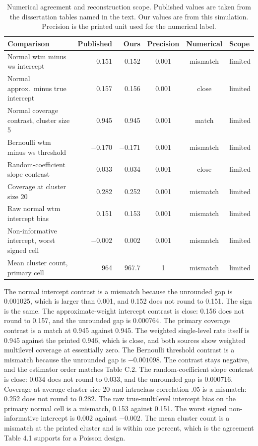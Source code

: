 \begin{table}[H]
\centering
\footnotesize
\setlength{\tabcolsep}{4pt}
\renewcommand{\arraystretch}{1.3}
\caption{Numerical agreement and reconstruction scope.
Published values are taken from the dissertation tables named in the text.
Our values are from this simulation.
Precision is the printed unit used for the numerical label.}
\label{tab:compare}
\begin{tabular}{@{}p{2.15in}rrccp{0.72in}@{}}
\toprule
Comparison & Published & Ours & Precision & Numerical & Scope \\
\midrule
Normal wtm minus ws intercept & 0.151 & 0.152 & 0.001 & mismatch & limited \\
Normal approx.\ minus true intercept & 0.157 & 0.156 & 0.001 & close & limited \\
Normal coverage contrast, cluster size 5 & 0.945 & 0.945 & 0.001 & match & limited \\
Bernoulli wtm minus ws threshold & $-0.170$ & $-0.171$ & 0.001 & mismatch & limited \\
Random-coefficient slope contrast & 0.033 & 0.034 & 0.001 & close & limited \\
Coverage at cluster size 20 & 0.282 & 0.252 & 0.001 & mismatch & limited \\
Raw normal wtm intercept bias & 0.151 & 0.153 & 0.001 & mismatch & limited \\
Non-informative intercept, worst signed cell & $-0.002$ & 0.002 & 0.001 & mismatch & limited \\
Mean cluster count, primary cell & 964 & 967.7 & 1 & mismatch & limited \\
\bottomrule
\end{tabular}
\end{table}

The normal intercept contrast is a mismatch because the unrounded gap is
0.001025, which is larger than 0.001, and 0.152 does not round to 0.151.
The sign is the same.
The approximate-weight intercept contrast is close: 0.156 does not round to
0.157, and the unrounded gap is 0.000764.
The primary coverage contrast is a match at 0.945 against 0.945.
The weighted single-level rate itself is 0.945 against the printed 0.946,
which is close, and both sources show weighted multilevel coverage at
essentially zero.
The Bernoulli threshold contrast is a mismatch because the unrounded gap is
$-0.001098$.
The contrast stays negative, and the estimator order matches Table C.2.
The random-coefficient slope contrast is close: 0.034 does not round to
0.033, and the unrounded gap is 0.000716.
Coverage at average cluster size 20 and intraclass correlation .05 is a
mismatch: 0.252 does not round to 0.282.
The raw true-multilevel intercept bias on the primary normal cell is a
mismatch, 0.153 against 0.151.
The worst signed non-informative intercept is 0.002 against $-0.002$.
The mean cluster count is a mismatch at the printed cluster and is within one
percent, which is the agreement Table 4.1 supports for a Poisson design.

